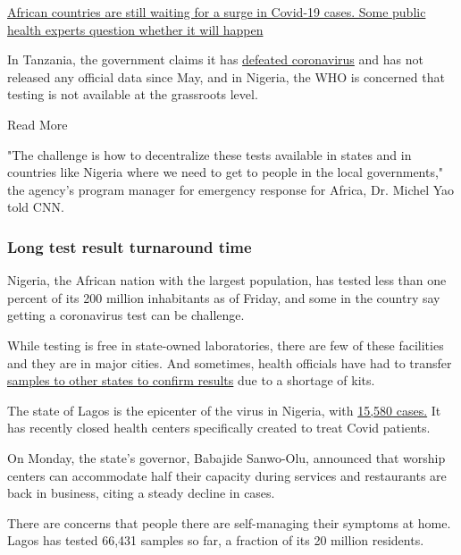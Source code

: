 \href{/2020/06/16/africa/africa-coronavirus-cases-prevention-intl/index.html}{African
countries are still waiting for a surge in Covid-19 cases. Some public
health experts question whether it will happen}

In Tanzania, the government claims it has
\href{https://edition.cnn.com/2020/06/09/africa/tanzania-president-covid-claims/index.html}{defeated
coronavirus} and has not released any official data since May, and in
Nigeria, the WHO is concerned that testing is not available at the
grassroots level.

Read More

"The challenge is how to decentralize these tests available in states
and in countries like Nigeria where we need to get to people in the
local governments," the agency's program manager for emergency response
for Africa, Dr. Michel Yao told CNN.

\hypertarget{long-test-result-turnaround-time}{%
\subsubsection{Long test result turnaround
time}\label{long-test-result-turnaround-time}}

Nigeria, the African nation with the largest population, has tested less
than one percent of its 200 million inhabitants as of Friday, and some
in the country say getting a coronavirus test can be challenge.

While testing is free in state-owned laboratories, there are few of
these facilities and they are in major cities. And sometimes, health
officials have had to transfer
\href{https://www.dailytrust.com.ng/covid-19-20-states-yet-to-have-testing-laboratories.html}{samples
to other states to confirm results} due to a shortage of kits.

The state of Lagos is the epicenter of the virus in Nigeria, with
\href{https://twitter.com/ProfAkinAbayomi/status/1291669133118132226?s=20}{15,580
cases.} It has recently closed health centers specifically created to
treat Covid patients.

On Monday, the state's governor, Babajide Sanwo-Olu, announced that
worship centers can accommodate half their capacity during services and
restaurants are back in business, citing a steady decline in cases.

There are concerns that people there are self-managing their symptoms at
home. Lagos has tested 66,431 samples so far, a fraction of its 20
million residents.

